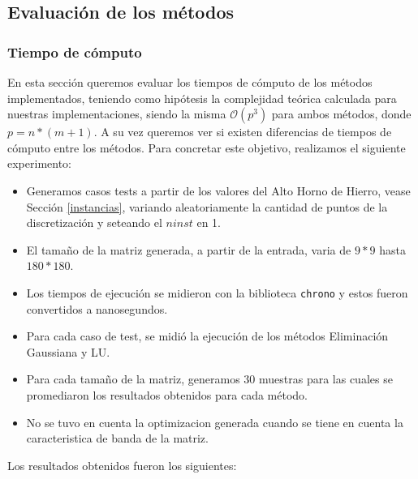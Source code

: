 \subsection{Evaluación de los métodos}

\subsubsection{Tiempo de cómputo}

En esta sección queremos evaluar los tiempos de cómputo de los métodos implementados, teniendo como hipótesis la complejidad teórica calculada para nuestras implementaciones,
siendo la misma $\mathcal{O}(p^3)$ para ambos métodos, donde $p = n*(m+1)$. A su vez queremos ver si existen diferencias de tiempos de cómputo entre los métodos.
\newline
\newline
Para concretar este objetivo, realizamos el siguiente experimento:
\begin{itemize}
    \item Generamos casos tests a partir de los valores del Alto Horno de Hierro, vease Sección \ref{instancias}, variando aleatoriamente la cantidad de puntos de la discretización y seteando el $ninst$ en 1.
    \item El tamaño de la matriz generada, a partir de la entrada, varia de $9*9$ hasta $180*180$.
    \item Los tiempos de ejecución se midieron con la biblioteca \texttt{chrono} y estos fueron convertidos a nanosegundos.
    \item Para cada caso de test, se midió la ejecución de los métodos Eliminación Gaussiana y LU.
    \item Para cada tamaño de la matriz, generamos $30$ muestras para las cuales se promediaron los resultados obtenidos para cada método.
    \item No se tuvo en cuenta la optimizacion generada cuando se tiene en cuenta la caracteristica de banda de la matriz.
\end{itemize}


Los resultados obtenidos fueron los siguientes:

\begin{center}

\end{center}

